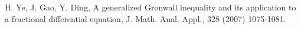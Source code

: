 \begin{thebibliography}{9}
	


 H. Ye, J. Gao, Y. Ding, A generalized Gronwall inequality and its application to a fractional differential equation, J. Math. Anal. Appl., 328 (2007) 1075-1081.

\end{thebibliography}

